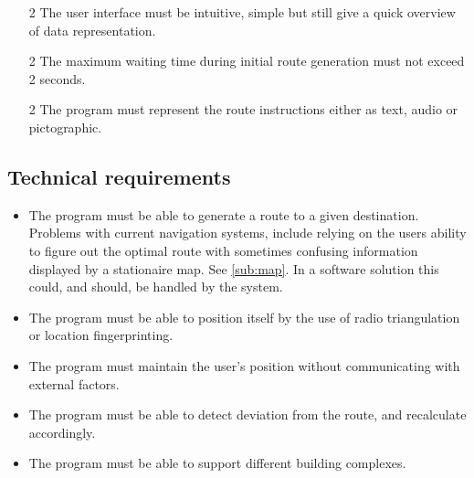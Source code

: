 \begin{itemize}
	\item[2] The user interface must be intuitive, simple but still give a quick overview of data representation.
	\item[2] The maximum waiting time during initial route generation must not exceed 2 seconds.
	\item[2] The program must represent the route instructions either as text, audio or pictographic.
\end{itemize}


\subsection{Technical requirements}

\begin{itemize}
	\item The program must be able to generate a route to a given destination. 
		{Problems with current navigation systems, include relying on the users ability to figure out the optimal route with sometimes confusing information displayed by a stationaire map. See \cref{sub:map}. In a software solution this could, and should, be handled by the system.}
	\item The program must be able to position itself by the use of radio triangulation or location fingerprinting.
	\item The program must maintain the user's position without communicating with external factors.
	\item The program must be able to detect deviation from the route, and recalculate accordingly.
	\item The program must be able to support different building complexes.
\end{itemize}





